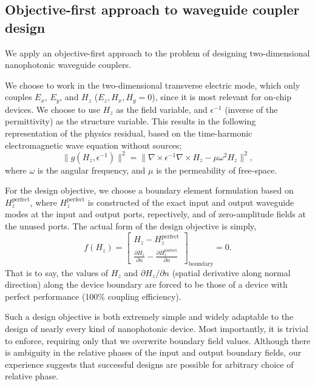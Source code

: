 \documentclass[letterpaper,10pt]{article}
\begin{document}
\subsection{Objective-first approach to waveguide coupler design}
We apply an objective-first approach to the problem of designing 
    two-dimensional nanophotonic waveguide couplers.

We choose to work in the two-dimensional transverse electric mode,
    which only couples $E_x$, $E_y$, and $H_z$ ($E_z, H_x, H_y = 0$),
    since it is most relevant for on-chip devices\cite{}.
We choose to use $H_z$ as the field variable, 
    and $\epsilon^{-1}$ (inverse of the permittivity) 
    as the structure variable.
This results in the following representation of the physics residual, 
    based on the time-harmonic electromagnetic wave equation without sources;
    \begin{equation}
    \|g(H_z, \epsilon^{-1})\|^2 = 
    \| \nabla \times \epsilon^{-1} \nabla \times H_z - \mu \omega^2 H_z \|^2,
    \end{equation}
    where $\omega$ is the angular frequency,
    and $\mu$ is the permeability of free-space.

For the design objective, we choose a boundary element formulation
    based on $H_z^\text{perfect}$,
    where $H_z^\text{perfect}$ is constructed 
    of the exact input and output waveguide modes at the input and output ports,
    repectively, and of zero-amplitude fields at the unused ports.
The actual form of the design objective is simply, 
    \begin{equation}
    f(H_z) = \begin{bmatrix}
        H_z - H_z^\text{perfect} \\
        \frac{\partial H_z}{\partial n} - 
            \frac{\partial H_z^\text{perfect}}{\partial n}
        \end{bmatrix}_\text{boundary}
        = 0.
    \end{equation}
That is to say,
    the values of $H_z$ and $\partial H_z / \partial n$
    (spatial derivative along normal direction)
    along the device boundary are forced to be 
    those of a device with perfect performance 
    (100\% coupling efficiency).
     
Such a design objective is both extremely simple and widely adaptable 
    to the design of nearly every kind of nanophotonic device.
Most importantly, it is trivial to enforce,
    requiring only that we overwrite boundary field values.
Although there is ambiguity in the relative phases of 
    the input and output boundary fields,
    our experience suggests that successful designs are possible for 
    arbitrary choice of relative phase.
\end{document}
